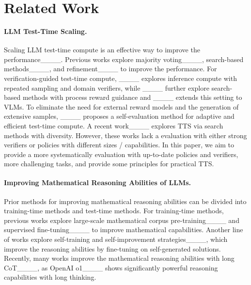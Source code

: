 \section{Related Work}
\paragraph{LLM Test-Time Scaling.}

Scaling LLM test-time compute is an effective way to improve the performance____. Previous works explore majority voting____, search-based methods____, and refinement____ to improve the performance. For verification-guided test-time compute, ____ explores inference compute with repeated sampling and domain verifiers, while ____ further explore search-based methods with process reward guidance and ____ extends this setting to VLMs. To eliminate the need for external reward models and the generation of extensive samples, ____ proposes a self-evaluation method for adaptive and efficient test-time compute. A recent work____ explores TTS via search methods with diversity. However, these works lack a evaluation with either strong verifiers or policies with different sizes / capabilities.
In this paper, we aim to provide a more systematically evaluation with up-to-date policies and verifiers, more challenging tasks, and provide some principles for practical TTS.


\paragraph{Improving Mathematical Reasoning Abilities of LLMs.}

Prior methods for improving mathematical reasoning abilities can be divided into training-time methods and test-time methods.
For training-time methods, previous works explore large-scale mathematical corpus pre-training____ and supervised fine-tuning____ to improve mathematical capabilities.
Another line of works explore self-training and self-improvement strategies____, which improve the reasoning abilities by fine-tuning on self-generated solutions.
Recently, many works improve the mathematical reasoning abilities with long CoT____, as OpenAI o1____ shows significantly powerful reasoning capabilities with long thinking.

